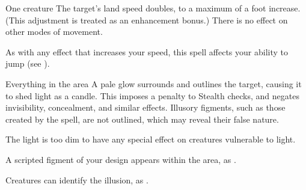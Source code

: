 \begin{spellheader}
    \spellrng{\rngclose}
    \spelldur{\durshort \dismissable}
\end{spellheader}
\begin{spelleffects}
    \begin{spelltarget}{One creature}
        \spelleffect The target's land speed doubles, to a maximum of a  foot increase. (This adjustment is treated as an enhancement bonus.) There is no effect on other modes of movement.
    \end{spelltarget}
\end{spelleffects}
\begin{spellfooter}
    \spellnotes As with any effect that increases your speed, this spell affects your ability to jump (see ).
\end{spellfooter}

\begin{comment}
\subsubsection{F}
\end{comment}

\begin{spellheader}
    \spelldur{\durshort \dismissable}
\end{spellheader}
\begin{spelleffects}
    \begin{spelltarget}{Everything in the area}
        \spelleffect A pale glow surrounds and outlines the target, causing it to shed light as a candle. This imposes a  penalty to Stealth checks, and negates invisibility, concealment, and similar effects. Illusory figments, such as those created by the  spell, are not outlined, which may reveal their false nature.
    \end{spelltarget}
\end{spelleffects}
\begin{spellfooter}
    \spellnotes The light is too dim to have any special effect on creatures vulnerable to light.
\end{spellfooter}

\begin{spellheader}
    \spelldur{\durlong \dismissable}
\end{spellheader}
\begin{spelleffects}
    \spelleffect A scripted figment of your design appears within the area, as .
\end{spelleffects}
\begin{spellfooter}
    \spellnotes Creatures can identify the illusion, as .
\end{spellfooter}

